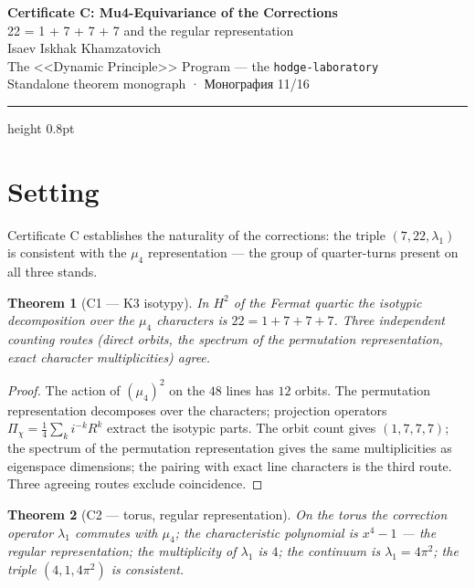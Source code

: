 \documentclass[11pt,a4paper]{article}
\theoremstyle{plain}
\newtheorem{theorem}{Theorem}
\theoremstyle{definition}
\theoremstyle{remark}
\begin{document}
\begin{center}
{\LARGE\bfseries Certificate C: Mu4-Equivariance of the Corrections}\\[0.4em]
{\large 22 = 1 + 7 + 7 + 7 and the regular representation}\\[0.6em]
{\normalsize Isaev Iskhak Khamzatovich}\\[0.2em]
{\normalsize The <<Dynamic Principle>> Program --- the \texttt{hodge-laboratory}}\\[0.15em]
{\small Standalone theorem monograph · Монография 11/16}
\end{center}
\vspace{0.4em}
{\color{linkblue}\hrule height 0.8pt}
\vspace{0.8em}

\section{Setting}

Certificate C establishes the naturality of the corrections: the
triple $(7,22,\lambda_1)$ is consistent with the $\mu_4$
representation --- the group of quarter-turns present on all three
stands.

\begin{theorem}[C1 --- K3 isotypy]\label{th:C1stand}
In $H^2$ of the Fermat quartic the isotypic decomposition over the
$\mu_4$ characters is $22=1+7+7+7$. Three independent counting
routes (direct orbits, the spectrum of the permutation
representation, exact character multiplicities) agree.
\end{theorem}

\begin{proof}
The action of $(\mu_4)^2$ on the $48$ lines has $12$ orbits. The
permutation representation decomposes over the characters;
projection operators $\Pi_\chi=\frac14\sum_k i^{-k}R^k$ extract the
isotypic parts. The orbit count gives $(1,7,7,7)$; the spectrum of
the permutation representation gives the same multiplicities as
eigenspace dimensions; the pairing with exact line characters is the
third route. Three agreeing routes exclude coincidence.
\end{proof}

\begin{theorem}[C2 --- torus, regular representation]\label{th:C2stand}
On the torus the correction operator $\lambda_1$ commutes with
$\mu_4$; the characteristic polynomial is $x^4-1$ --- the regular
representation; the multiplicity of $\lambda_1$ is $4$; the
continuum is $\lambda_1=4\pi^2$; the triple $(4,1,4\pi^2)$ is
consistent.
\end{theorem}
\end{document}
